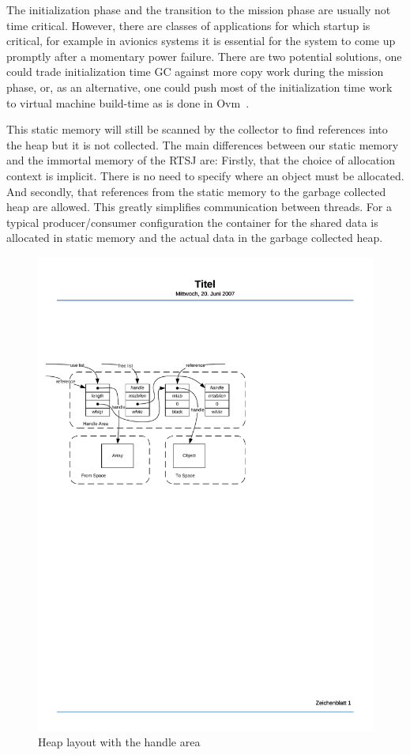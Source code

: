 The initialization phase and the transition to the mission phase are
usually not time critical. However, there are classes of
applications for which startup is critical, for example in avionics
systems it is essential for the system to come up promptly after a
momentary power failure. There are two potential solutions, one
could trade initialization time GC against more copy work during the
mission phase, or, as an alternative, one could push most of the
initialization time work to virtual machine build-time as is done in
Ovm~\cite{ovm:tecs:07}.

This static memory will still be scanned by the collector to find
references into the heap but it is not collected. The main
differences between our static memory and the immortal memory of the
RTSJ are: Firstly, that the choice of allocation context is
implicit. There is no need to specify where an object must be
allocated. And secondly, that references from the static memory to
the garbage collected heap are allowed.  This greatly simplifies
communication between threads.  For a typical producer/consumer
configuration the container for the shared data is allocated in
static memory and the actual data in the garbage collected heap.


\begin{figure}  \centering
  \includegraphics{jvm/handles}
  \caption{Heap layout with the handle area}\label{fig:handles}
\end{figure}


